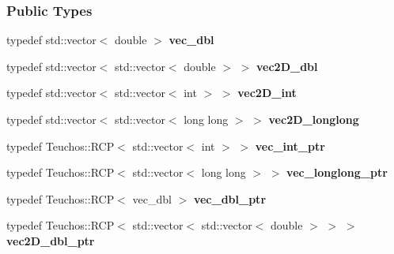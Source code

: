 \subsubsection*{Public Types}
\begin{DoxyCompactItemize}
\item 
\mbox{\label{classFEDD_1_1ExporterParaViewAMR_ad857d990c6d8bcc423703888a1944171}} 
typedef std\+::vector$<$ double $>$ {\bfseries vec\+\_\+dbl}
\item 
\mbox{\label{classFEDD_1_1ExporterParaViewAMR_a87c4014047e4914271a871d26324be53}} 
typedef std\+::vector$<$ std\+::vector$<$ double $>$ $>$ {\bfseries vec2\+D\+\_\+dbl}
\item 
\mbox{\label{classFEDD_1_1ExporterParaViewAMR_a3f24281f52a42497ad16524768407426}} 
typedef std\+::vector$<$ std\+::vector$<$ int $>$ $>$ {\bfseries vec2\+D\+\_\+int}
\item 
\mbox{\label{classFEDD_1_1ExporterParaViewAMR_aeb941029c519943fbbd78fa19617160b}} 
typedef std\+::vector$<$ std\+::vector$<$ long long $>$ $>$ {\bfseries vec2\+D\+\_\+longlong}
\item 
\mbox{\label{classFEDD_1_1ExporterParaViewAMR_a3e13a99469a71351669c8db5b4b27652}} 
typedef Teuchos\+::\+R\+CP$<$ std\+::vector$<$ int $>$ $>$ {\bfseries vec\+\_\+int\+\_\+ptr}
\item 
\mbox{\label{classFEDD_1_1ExporterParaViewAMR_a2160534f29ad8e3030a39f191046d22c}} 
typedef Teuchos\+::\+R\+CP$<$ std\+::vector$<$ long long $>$ $>$ {\bfseries vec\+\_\+longlong\+\_\+ptr}
\item 
\mbox{\label{classFEDD_1_1ExporterParaViewAMR_a23051f635711fcea08566b941ae116d6}} 
typedef Teuchos\+::\+R\+CP$<$ vec\+\_\+dbl $>$ {\bfseries vec\+\_\+dbl\+\_\+ptr}
\item 
\mbox{\label{classFEDD_1_1ExporterParaViewAMR_ae1bcea1ccf798922bfe00746712617a4}} 
typedef Teuchos\+::\+R\+CP$<$ std\+::vector$<$ std\+::vector$<$ double $>$ $>$ $>$ {\bfseries vec2\+D\+\_\+dbl\+\_\+ptr}

\end{DoxyCompactItemize}
